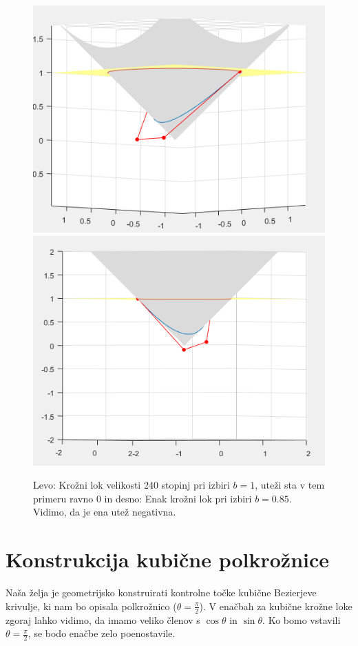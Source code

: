 \documentclass[a4paper,12pt]{article}
\begin{document}
\begin{figure}[h]
\includegraphics[scale=0.45]{b1kot120.png}
\includegraphics[scale=0.45]{b085kot120.png}
\centering
\caption{Levo: Krožni lok velikosti 240 stopinj pri izbiri $b=1$, uteži sta v tem primeru ravno 0 in desno: Enak krožni lok pri izbiri $b=0.85$. Vidimo, da je ena utež negativna.}
\end{figure}

\section{Konstrukcija kubične polkrožnice}
Naša želja je geometrijsko konstruirati kontrolne točke kubične Bezierjeve krivulje, ki nam bo opisala polkrožnico ($\theta = \frac{\pi}{2}$). V enačbah za kubične krožne loke zgoraj lahko vidimo, da imamo veliko členov s $\cos \theta$ in $\sin \theta$. Ko bomo vstavili $\theta=\frac{\pi}{2}$, se bodo enačbe zelo poenostavile. 
\end{document}
